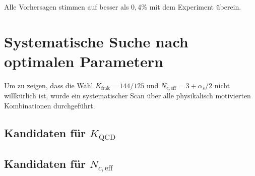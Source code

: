 	Alle Vorhersagen stimmen auf besser als $0{,}4\%$ mit dem Experiment überein.
	
	
	\section{Systematische Suche nach optimalen Parametern}
	
	Um zu zeigen, dass die Wahl $K_\text{frak} = 144/125$ und $N_{c,\text{eff}} = 3 + \alpha_s/2$ nicht willkürlich ist, wurde ein systematischer Scan über alle physikalisch motivierten Kombinationen durchgeführt.
	
	\subsection{Kandidaten für $K_\text{QCD}$}
	
	\begin{table}[h]
		\centering
		\caption{Kandidaten für den Korrekturfaktor $K_\text{QCD}$}
	\end{table}
	
	\subsection{Kandidaten für $N_{c,\text{eff}}$}
	
	\begin{table}[h]
		\centering
		\caption{Kandidaten für den effektiven Farbfaktor}
	\end{table}
	
